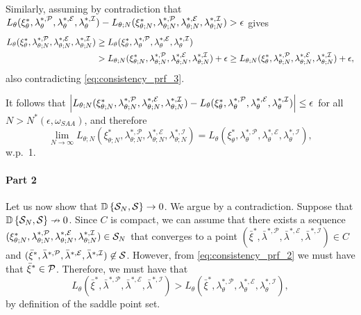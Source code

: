 Similarly, assuming by contradiction that $ L_{\theta}(\xi^*_{\theta},\lambda^{*,\mathcal P}_{\theta},\lambda^{*,\mathcal E}_{\theta},\lambda^{*,\mathcal I}_{\theta}) - L_{\theta;N}(\xi^*_{\theta;N},\lambda^{*,\mathcal P}_{\theta;N},\lambda^{*,\mathcal E}_{\theta;N},\lambda^{*,\mathcal I}_{\theta;N})> \epsilon$ gives
\begin{equation*}
\begin{split}
    L_{\theta}(\xi^*_{\theta},\lambda^{*,\mathcal P}_{\theta;N},\lambda^{*,\mathcal E}_{\theta;N},\lambda^{*,\mathcal I}_{\theta;N}) &\geq L_{\theta}(\xi^*_{\theta},\lambda^{*,\mathcal P}_{\theta},\lambda^{*,\mathcal E}_{\theta},\lambda^{*,\mathcal I}_{\theta}) \\ &> L_{\theta;N}(\xi^*_{\theta;N},\lambda^{*,\mathcal P}_{\theta;N},\lambda^{*,\mathcal E}_{\theta;N},\lambda^{*,\mathcal I}_{\theta;N})  + \epsilon \geq L_{\theta;N}(\xi^*_{\theta},\lambda^{*,\mathcal P}_{\theta;N},\lambda^{*,\mathcal E}_{\theta;N},\lambda^{*,\mathcal I}_{\theta;N}) + \epsilon,
\end{split}
\end{equation*}
also contradicting \eqref{eq:consistency_prf_3}.

It follows that $\left| L_{\theta;N}(\xi^*_{\theta;N},\lambda^{*,\mathcal P}_{\theta;N},\lambda^{*,\mathcal E}_{\theta;N},\lambda^{*,\mathcal I}_{\theta;N}) - L_{\theta}(\xi^*_{\theta},\lambda^{*,\mathcal P}_{\theta},\lambda^{*,\mathcal E}_{\theta},\lambda^{*,\mathcal I}_{\theta}) \right| \leq \epsilon$ for all $N > N^*(\epsilon,\omega_{SAA})$, and therefore
\begin{equation}\label{eq:consistency_prf_L_converges}
  \lim_{N\to \infty} L_{\theta;N}(\xi^*_{\theta;N},\lambda^{*,\mathcal P}_{\theta;N},\lambda^{*,\mathcal E}_{\theta;N},\lambda^{*,\mathcal I}_{\theta;N}) = L_{\theta}(\xi^*_{\theta},\lambda^{*,\mathcal P}_{\theta},\lambda^{*,\mathcal E}_{\theta},\lambda^{*,\mathcal I}_{\theta}),
\end{equation}
w.p.~1.

\paragraph{Part 2}
Let us now show that $\mathbb D \left\{ {\mathcal S_{N}}, {\mathcal S}\right\} \to 0$. We argue by a contradiction. Suppose that $\mathbb D \left\{ {\mathcal S_{N}}, {\mathcal S}\right\} \nrightarrow 0$. Since $C$ is compact, we can assume that there exists a sequence $(\xi^*_{\theta;N},\lambda^{*,\mathcal P}_{\theta;N},\lambda^{*,\mathcal E}_{\theta;N},\lambda^{*,\mathcal I}_{\theta;N}) \in \mathcal S_{N}$ that converges to a point $(\bar{\xi}^*,\bar{\lambda}^{*,\mathcal P},\bar{\lambda}^{*,\mathcal E},\bar{\lambda}^{*,\mathcal I})\in C$ and
$(\bar{\xi}^*,\bar{\lambda}^{*,\mathcal P},\bar{\lambda}^{*,\mathcal E},\bar{\lambda}^{*,\mathcal I}) \not\in \mathcal S$. However, from \eqref{eq:consistency_prf_2} we must have that $\bar{\xi}^* \in \mathcal P$. Therefore, we must have that
\begin{equation*}
    L_{\theta}(\bar{\xi}^*,\bar{\lambda}^{*,\mathcal P},\bar{\lambda}^{*,\mathcal E},\bar{\lambda}^{*,\mathcal I}) > L_{\theta}(\bar{\xi}^*,\lambda^{*,\mathcal P}_{\theta},\lambda^{*,\mathcal E}_{\theta},\lambda^{*,\mathcal I}_{\theta}),
\end{equation*}
by definition of the saddle point set.

